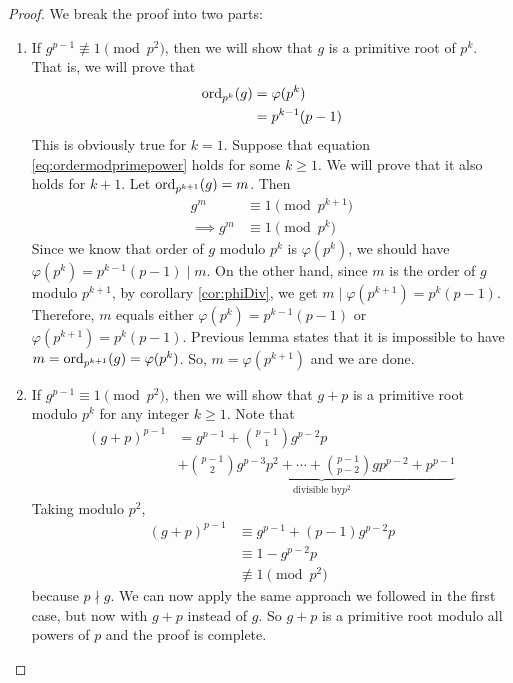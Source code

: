\documentclass{subfile}
\begin{document}
	\begin{proof}
		We break the proof into two parts:
		\begin{enumerate}
			\item If $g^{p-1} \not \equiv 1 \pmod{p^2}$, then we will show that $g$ is a primitive root of $p^k$. That is, we will prove that
				\begin{align}\label{eq:ordermodprimepower}
					\operatorname{ord}_{p^k} (g)
						& =\varphi(p^k)\\
						& =p^{k-1}(p-1)
				\end{align}
			This is obviously true for $k=1$. Suppose that equation \eqref{eq:ordermodprimepower} holds for some $k\geq 1$. We will prove that it also holds for $k+1$. Let $\operatorname{ord}_{p^{k+1}} (g)=m$. Then
				\begin{align*}
					g^m
						& \equiv 1 \pmod{p^{k+1}}\\
					\implies g^m
						& \equiv 1 \pmod{p^{k}}
				\end{align*}
			Since we know that order of $g$ modulo $p^k$ is $\varphi(p^k)$, we should have $\varphi(p^k)=p^{k-1}(p-1)\mid m$. On the other hand, since $m$ is the order of $g$ modulo $p^{k+1}$, by corollary \eqref{cor:phiDiv}, we get $m\mid \varphi(p^{k+1})=p^k(p-1)$. Therefore, $m$ equals either $\varphi(p^k)=p^{k-1}(p-1)$ or $\varphi(p^{k+1})=p^{k}(p-1)$. Previous lemma states that it is impossible to have $m=\operatorname{ord}_{p^{k+1}} (g)=\varphi(p^k)$. So, $m=\varphi(p^{k+1})$ and we are done.

			\item If $g^{p-1} \equiv 1 \pmod{p^2}$, then we will show that $g+p$ is a primitive root modulo $p^k$ for any integer $k\geq 1$. Note that
				\begin{align*}
					(g+p)^{p-1}
						& = g^{p-1} + \binom{p-1}{1} g^{p-2}p \\
						& + \underbrace{\binom{p-1}{2}g^{p-3}p^2+\cdots + \binom{p-1}{p-2} gp^{p-2} + p^{p-1}}_{\mbox{divisible by} p^2}
				\end{align*}
			Taking modulo $p^2$,
				\begin{align*}
					(g+p)^{p-1}
						& \equiv g^{p-1}+(p-1)g^{p-2}p\\
						& \equiv 1 - g^{p-2}p\\
						& \not \equiv 1 \pmod{p^2}
				\end{align*}
			because $p \nmid g$. We can now apply the same approach we followed in the first case, but now with $g+p$ instead of $g$. So $g+p$ is a primitive root modulo all powers of $p$ and the proof is complete.
		\end{enumerate}
	\end{proof}
\end{document}
